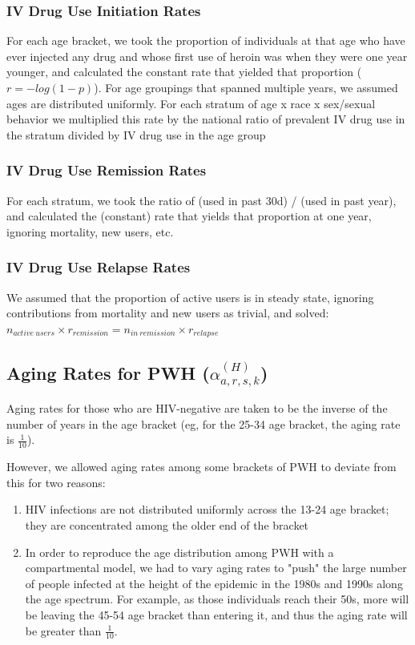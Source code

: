 \documentclass{article}
\begin{document}
\subsubsection{IV Drug Use Initiation Rates}
For each age bracket, we took the proportion of individuals at that age who have ever injected any drug and whose first use of heroin was when they were one year younger, and calculated the constant rate that yielded that proportion ($r = -log(1-p)$). For age groupings that spanned multiple years, we assumed ages are distributed uniformly. For each stratum of age x race x sex/sexual behavior we multiplied this rate by the national ratio of prevalent IV drug use in the stratum divided by IV drug use in the age group

\subsubsection{IV Drug Use Remission Rates}
For each stratum, we took the ratio of (used in past 30d) / (used in past year), and calculated the (constant) rate that yields that proportion at one year, ignoring mortality, new users, etc.

\subsubsection{IV Drug Use Relapse Rates}
We assumed that the proportion of active users is in steady state, ignoring contributions from mortality and new users as trivial, and solved: $n_{active\ users} \times  r_{remission} = n_{in\ remission} \times r_{relapse}$



\subsection{Aging Rates for PWH \big($\alpha^{(H)}_{a,r,s,k}$\big)}\label{aging}

Aging rates for those who are HIV-negative are taken to be the inverse of the number of years in the age bracket (eg, for the 25-34 age bracket, the aging rate is $\frac{1}{10}$).

However, we allowed aging rates among some brackets of PWH to deviate from this for two reasons:
\begin{enumerate}
	\item HIV infections are not distributed uniformly across the 13-24 age bracket; they are concentrated among the older end of the bracket
	\item In order to reproduce the age distribution among PWH with a compartmental model, we had to vary aging rates to "push" the large number of people infected at the height of the epidemic in the 1980s and 1990s along the age spectrum. For example, as those individuals reach their 50s, more will be leaving the 45-54 age bracket than entering it, and thus the aging rate will be greater than $\frac{1}{10}$.
\end{enumerate}
\end{document}
